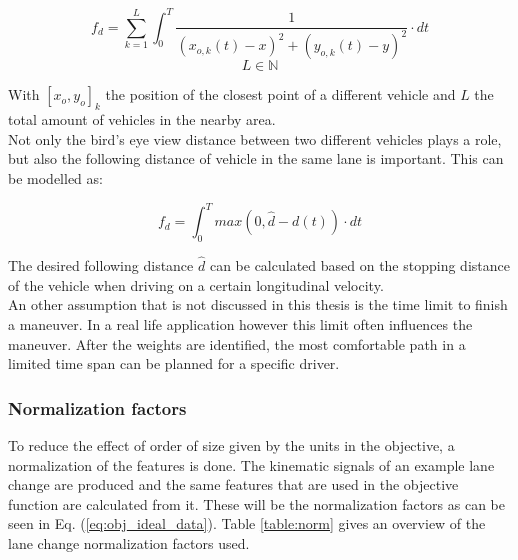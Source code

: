 \begin{equation}\label{eq:comfort_feature}
f_d= \sum_{k = 1}^{L}\int_{0}^{T}\frac{1}{(x_{o,k}(t)-x)^2+(y_{o,k}(t)-y)^2}\cdot dt
\end{equation}
\[L \in \mathbb{N}\]

With $[x_o,y_o]_k$ the position of the closest point of a different vehicle and $L$ the total amount of vehicles in the nearby area.\\

Not only the bird's eye view distance between two different vehicles plays a role, but also the following distance of vehicle in the same lane is important. This can be modelled as:  

\begin{equation}\label{eq:lane_d}
f_d= \int_{0}^{T} max(0,\hat{d}-d(t))\cdot dt
\end{equation}


The desired following distance $\hat{d}$ can be calculated based on the stopping distance of the vehicle when driving on a certain longitudinal velocity. \\

An other assumption that is not discussed in this thesis is the time limit to finish a maneuver. In a real life application however this limit often influences the maneuver. After the weights are identified, the most comfortable path in a limited time span can be planned for a specific driver. 

\subsubsection{Normalization factors} \label{s:norm}
To reduce the effect of order of size given by the units in the objective, a normalization of the features is done. The kinematic signals of an example lane change are produced and the same features that are used in the objective function are calculated from it. These will be the normalization factors as can be seen in Eq. (\ref{eq:obj_ideal_data}). Table \ref{table:norm} gives an overview of the lane change normalization factors used. 


